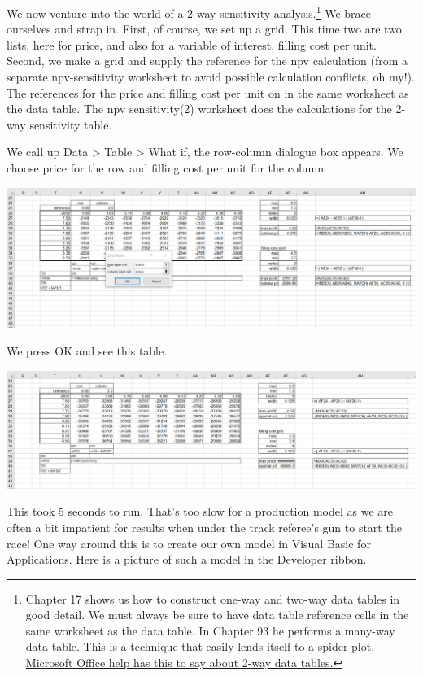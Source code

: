 \documentclass[
]{book}
\begin{document}
We now venture into the world of a 2-way sensitivity analysis.\footnote{\citet{Winston2019} Chapter 17 shows us how to construct one-way and two-way data tables in good detail. We must always be sure to have data table reference cells in the same worksheet as the data table. In Chapter 93 he performs a many-way data table. This is a technique that easily lends itself to a spider-plot. \href{https://docs.microsoft.com/en-us/office/troubleshoot/excel/create-two-input-data-tables}{Microsoft Office help has this to say about 2-way data tables.}} We brace ourselves and strap in. First, of course, we set up a grid. This time two are two lists, here for price, and also for a variable of interest, filling cost per unit. Second, we make a grid and supply the reference for the npv calculation (from a separate npv-sensitivity worksheet to avoid possible calculation conflicts, oh my!). The references for the price and filling cost per unit on in the same worksheet as the data table. The npv sensitivity(2) worksheet does the calculations for the 2-way sensitivity table.

We call up Data \textgreater{} Table \textgreater{} What if, the row-column dialogue box appears. We choose price for the row and filling cost per unit for the column.

\includegraphics{images/02/pie-sensitivity-npv-2-way-data-table.jpg}

We press OK and see this table.

\includegraphics{images/02/pie-sensitivity-npv-2-way-data-table-result.jpg}

This took 5 seconds to run. That's too slow for a production model as we are often a bit impatient for results when under the track referee's gun to start the race! One way around this is to create our own model in Visual Basic for Applications. Here is a picture of such a model in the Developer ribbon.
\end{document}
